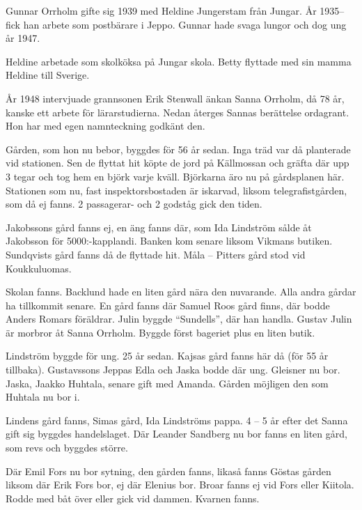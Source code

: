 Gunnar Orrholm gifte sig 1939 med Heldine Jungerstam från Jungar. År 1935-- fick han arbete som postbärare i Jeppo. Gunnar hade svaga lungor och dog ung år 1947.
\begin{jhchildren}
  \item {}
  \item {}
\end{jhchildren}
Heldine arbetade som skolköksa på Jungar skola. Betty flyttade med sin mamma Heldine till Sverige.



År 1948 intervjuade grannsonen Erik Stenwall änkan Sanna Orrholm, då 78 år, kanske ett arbete för lärarstudierna. Nedan återges Sannas berättelse ordagrant. Hon har med egen namnteckning godkänt den.


Gården, som hon nu bebor, byggdes för 56 år sedan. Inga träd var då planterade vid stationen. Sen de flyttat hit köpte de jord på Källmossan och gräfta där upp 3 tegar och tog hem en björk varje kväll. Björkarna äro nu på gårdsplanen här.
Stationen som nu, fast inspektorsbostaden är iskarvad, liksom telegrafistgården, som då ej fanns. 2 passagerar- och 2 godståg gick den tiden.

Jakobssons gård fanns ej, en äng fanns där, som Ida Lindström sålde åt Jakobsson för 5000:-kapplandi.
Banken kom senare liksom Vikmans butiken. Sundqvists gård fanns då de flyttade hit. Måla – Pitters gård stod vid Koukkuluomas.

Skolan fanns. Backlund hade en liten gård nära den nuvarande. Alla andra gårdar ha tillkommit senare. En gård fanns där Samuel Roos gård finns, där bodde Anders Romars föräldrar. Julin byggde ``Sundells'', där han handla. Gustav Julin är morbror åt Sanna Orrholm. Byggde först bageriet plus en liten butik.

Lindström byggde för ung. 25 år sedan. Kajsas gård fanns här då (för 55 år tillbaka). Gustavssons Jeppas Edla och Jaska bodde där ung. Gleisner nu bor. Jaska, Jaakko Huhtala, senare gift med Amanda. Gården möjligen den som Huhtala nu bor i.

Lindens gård fanns, Simas gård, Ida Lindströms pappa. 4 – 5 år efter det Sanna gift sig byggdes handelslaget. Där Leander Sandberg nu bor fanns en liten gård, som revs och byggdes större.

Där Emil Fors nu bor sytning, den gården fanns, likaså fanns Göstas gården liksom där Erik Fors bor, ej där Elenius bor.
Broar fanns ej vid Fors eller Kiitola. Rodde med båt över eller gick vid dammen. Kvarnen fanns.

